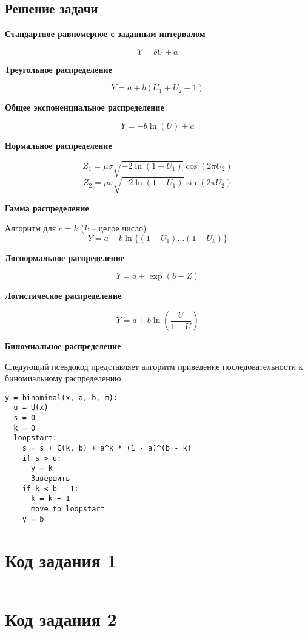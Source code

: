 \documentclass[spec, och, labwork]{shiza}
\begin{document}
\subsection{Решение задачи}

\begin{center}
  \textbf{Стандартное равномерное с заданным интервалом}
\end{center}
\[ Y = bU + a \]

\begin{center}
  \textbf{Треугольное распределение}
\end{center}
\[ Y = a + b(U_1 + U_2 - 1) \]

\begin{center}
  \textbf{Общее экспоненциальное распределение}
\end{center}
\[ Y = -b \ln(U) + a \]

\begin{center}
  \textbf{Нормальное распределение}
\end{center}
\[ Z_1 = \mu \sigma \sqrt{-2 \ln(1 - U_1)} \cos(2 \pi U_2) \]
\[ Z_2 = \mu \sigma \sqrt{-2 \ln(1 - U_1)} \sin(2 \pi U_2) \]

\begin{center}
  \textbf{Гамма распределение}
\end{center}
Алгоритм для $c = k$ ($k$ -- целое число)
\[ Y = a - b \ln \{(1 - U_1) \dots (1 - U_k)\} \]

\begin{center}
  \textbf{Логнормальное распределение}
\end{center}
\[ Y = a + \exp(b - Z) \]

\begin{center}
  \textbf{Логистическое распределение}
\end{center}
\[ Y = a + b \ln(\frac{U}{1 - U})\]

\begin{center}
  \textbf{Биномиальное распределение}
\end{center}
Следующий псевдокод представляет алгоритм приведение последовательности к биномиальному распределению
\begin{verbatim}
y = binominal(x, a, b, m):
  u = U(x)
  s = 0
  k = 0
  loopstart:
    s = s + C(k, b) + a^k * (1 - a)^(b - k)
    if s > u:
      y = k
      Завершить
    if k < b - 1:
      k = k + 1
      move to loopstart
    y = b
\end{verbatim}
\newpage
\appendix
    \section{Код задания 1}
    \inputminted[fontsize=\footnotesize]{text}{../../task1/task1.py}

    \section{Код задания 2}
    \inputminted[fontsize=\footnotesize]{text}{../../task2/task2.py}
\end{document}
